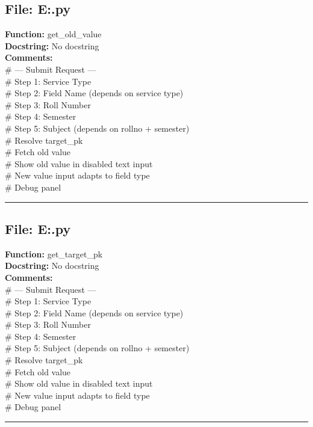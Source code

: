 {\subsection*{File: E:\project\capstone\frontend\faculty\request.py}
\textbf{Function:} get_old_value\\
\textbf{Docstring:} No docstring\\
\textbf{Comments:}\\
# --- Submit Request ---\\
# Step 1: Service Type\\
# Step 2: Field Name (depends on service type)\\
# Step 3: Roll Number\\
# Step 4: Semester\\
# Step 5: Subject (depends on rollno + semester)\\
# Resolve target\_pk\\
# Fetch old value\\
# Show old value in disabled text input\\
# New value input adapts to field type\\
# Debug panel\\

\hrule

\subsection*{File: E:\project\capstone\frontend\faculty\request.py}
\textbf{Function:} get_target_pk\\
\textbf{Docstring:} No docstring\\
\textbf{Comments:}\\
# --- Submit Request ---\\
# Step 1: Service Type\\
# Step 2: Field Name (depends on service type)\\
# Step 3: Roll Number\\
# Step 4: Semester\\
# Step 5: Subject (depends on rollno + semester)\\
# Resolve target\_pk\\
# Fetch old value\\
# Show old value in disabled text input\\
# New value input adapts to field type\\
# Debug panel\\

\hrule

}
